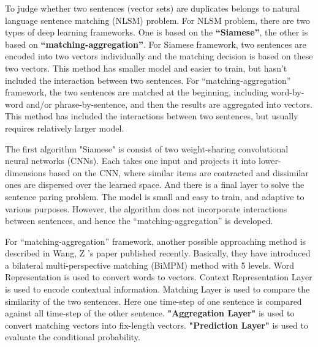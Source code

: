 \documentclass[12pt]{article}
\begin{document}
To judge whether two sentences (vector sets) are duplicates belongs to natural language sentence matching (NLSM) problem. For NLSM problem, there are two types of deep learning frameworks. One is based on the \textbf{“Siamese”}, the other is based on \textbf{“matching-aggregation”}. For Siamese framework, two sentences are encoded into two vectors individually and the matching decision is based on these two vectors. This method has smaller model and easier to train, but hasn’t included the interaction between two sentences. For “matching-aggregation” framework, the two sentences are matched at the beginning, including word-by-word and/or phrase-by-sentence, and then the results are aggregated into vectors. This method has included the interactions between two sentences, but usually requires relatively larger model.

The first algorithm "Siamese"\cite{erogel's blog} is consist of two weight-sharing convolutional neural networks (CNNs). Each takes one input and projects it into lower-dimensions based on the CNN, where similar items are contracted and dissimilar ones are dispersed over the learned space. And there is a final layer to solve the sentence paring problem. The model is small and easy to train, and adaptive to various purposes. However, the algorithm does not incorporate interactions between sentences, and hence the “matching-aggregation” is developed.

For “matching-aggregation” framework, another possible approaching method is described in Wang, Z ’s paper published recently.\cite{Z. Wang et al. Bilateral Multi-Perspective Matching for Natural Language Sentences. arXiv. 2017} Basically, they have introduced a bilateral multi-perspective matching (BiMPM) method with 5 levels. Word Representation is used to convert words to vectors. Context Representation Layer is used to encode contextual information. Matching Layer is used to compare the similarity of the two sentences. Here one time-step of one sentence is compared against all time-step of the other sentence. \textbf{"Aggregation Layer"} is used to convert matching vectors into fix-length vectors. \textbf{"Prediction Layer"} is used to evaluate the conditional probability. 


%
\end{document}
